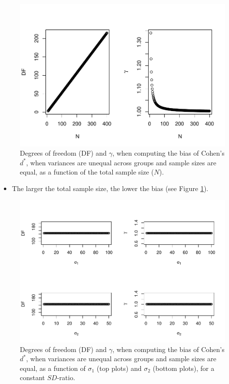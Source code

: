 \documentclass[
  english,
  man,mask]{apa6}
\providecommand{\tightlist}{%
  \setlength{\itemsep}{0pt}\setlength{\parskip}{0pt}}
\begin{document}
\begin{figure}
\centering
\includegraphics{Theoretical-Bias-of-all-estimators-as-a-function-of-population-parameters_files/figure-latex/biascohendprimehetbalNsize2-1.pdf}
\caption{\label{fig:biascohendprimehetbalNsize2}Degrees of freedom (DF) and \(\gamma\), when computing the bias of Cohen's \(d^*\), when variances are unequal across groups and sample sizes are equal, as a function of the total sample size (\(N\)).}
\end{figure}

\begin{itemize}
\tightlist
\item
  The larger the total sample size, the lower the bias (see Figure \ref{fig:biascohendprimehetbalNsize2}).
\end{itemize}

\begin{figure}
\centering
\includegraphics{Theoretical-Bias-of-all-estimators-as-a-function-of-population-parameters_files/figure-latex/biascohendprimehetbalvariance2-1.pdf}
\caption{\label{fig:biascohendprimehetbalvariance2}Degrees of freedom (DF) and \(\gamma\), when computing the bias of Cohen's \(d^*\), when variances are unequal across groups and sample sizes are equal, as a function of \(\sigma_1\) (top plots) and \(\sigma_2\) (bottom plots), for a constant \(SD\)-ratio.}
\end{figure}
\end{document}
